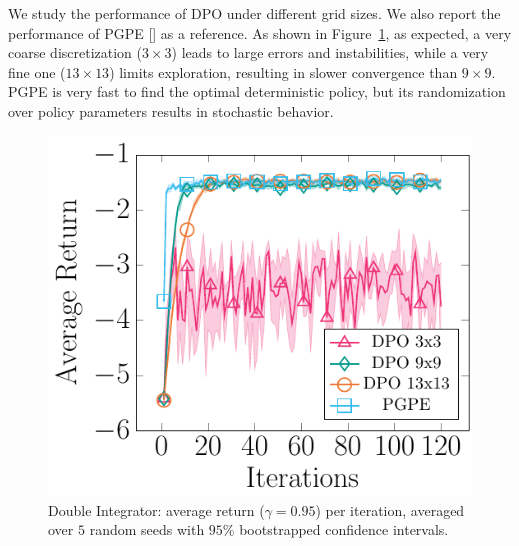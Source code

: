 \newline
We study the performance of \ac{DPO} under different grid sizes. We also report the performance of \ac{PGPE} [\cite{sehnke2008policy}] as a reference. As shown in Figure~\ref{fig:mass}, as expected, a very coarse discretization ($3\times3$) leads to large errors and instabilities, while a very fine one ($13\times13$) limits exploration, resulting in slower convergence than $9\times9$. \ac{PGPE} is very fast to find the optimal deterministic policy, but its randomization over policy parameters results in stochastic behavior.
\begin{figure}[t]
	\includegraphics[width=\textwidth]{plots/mass.pdf}
	\caption{Double Integrator: average return ($\gamma=0.95$) per iteration, averaged over $5$ random seeds with $95\%$ bootstrapped confidence intervals.}
	\label{fig:mass}
\end{figure}%

